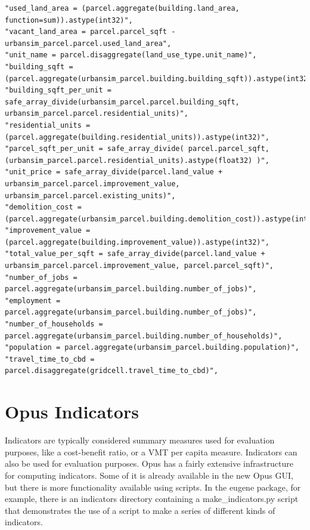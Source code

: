 \begin{lstlisting}
"used_land_area = (parcel.aggregate(building.land_area, function=sum)).astype(int32)",
"vacant_land_area = parcel.parcel_sqft - urbansim_parcel.parcel.used_land_area",
"unit_name = parcel.disaggregate(land_use_type.unit_name)",
"building_sqft = (parcel.aggregate(urbansim_parcel.building.building_sqft)).astype(int32)",
"building_sqft_per_unit = safe_array_divide(urbansim_parcel.parcel.building_sqft, urbansim_parcel.parcel.residential_units)",
"residential_units = (parcel.aggregate(building.residential_units)).astype(int32)",       
"parcel_sqft_per_unit = safe_array_divide( parcel.parcel_sqft, (urbansim_parcel.parcel.residential_units).astype(float32) )",
"unit_price = safe_array_divide(parcel.land_value + urbansim_parcel.parcel.improvement_value, urbansim_parcel.parcel.existing_units)",
"demolition_cost = (parcel.aggregate(urbansim_parcel.building.demolition_cost)).astype(int32)",
"improvement_value = (parcel.aggregate(building.improvement_value)).astype(int32)",
"total_value_per_sqft = safe_array_divide(parcel.land_value + urbansim_parcel.parcel.improvement_value, parcel.parcel_sqft)",
"number_of_jobs = parcel.aggregate(urbansim_parcel.building.number_of_jobs)",
"employment = parcel.aggregate(urbansim_parcel.building.number_of_jobs)",
"number_of_households = parcel.aggregate(urbansim_parcel.building.number_of_households)",
"population = parcel.aggregate(urbansim_parcel.building.population)",
"travel_time_to_cbd = parcel.disaggregate(gridcell.travel_time_to_cbd)",       
\end{lstlisting}

\section{Opus Indicators}
\label{sec:opus-indicators}

Indicators are typically considered summary measures used for
evaluation purposes, like a cost-benefit ratio, or a VMT per capita
measure.  Indicators can also be used for evaluation purposes.  Opus
has a fairly extensive infrastructure for computing indicators.  Some
of it is already available in the new Opus GUI, but there is more
functionality available using scripts.  In the eugene package, for
example, there is an indicators directory containing a
make\_indicators.py script that demonstrates the use of a script to
make a series of different kinds of indicators.  

